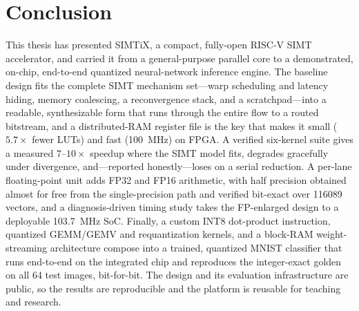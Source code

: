 \documentclass[12pt,a4paper,oneside]{report}
\begin{document}
\section{Conclusion}
This thesis has presented SIMTiX, a compact, fully-open RISC-V SIMT accelerator,
and carried it from a general-purpose parallel core to a demonstrated, on-chip,
end-to-end quantized neural-network inference engine. The baseline design fits the
complete SIMT mechanism set---warp scheduling and latency hiding, memory
coalescing, a reconvergence stack, and a scratchpad---into a readable,
synthesizable form that runs through the entire flow to a routed bitstream, and a
distributed-RAM register file is the key that makes it small ($5.7\times$ fewer
LUTs) and fast (\SI{100}{\mega\hertz}) on FPGA. A verified six-kernel suite gives a
measured $7$--$10\times$ speedup where the SIMT model fits, degrades gracefully
under divergence, and---reported honestly---loses on a serial reduction. A per-lane
floating-point unit adds FP32 and FP16 arithmetic, with half precision obtained
almost for free from the single-precision path and verified bit-exact over
\num{116089} vectors, and a diagnosis-driven timing study takes the FP-enlarged
design to a deployable \SI{103.7}{\mega\hertz} SoC. Finally, a custom INT8
dot-product instruction, quantized GEMM/GEMV and requantization kernels, and a
block-RAM weight-streaming architecture compose into a trained, quantized MNIST
classifier that runs end-to-end on the integrated chip and reproduces the
integer-exact golden on all 64 test images, bit-for-bit. The design and its
evaluation infrastructure are public, so the results are reproducible and the
platform is reusable for teaching and research.
\end{document}
